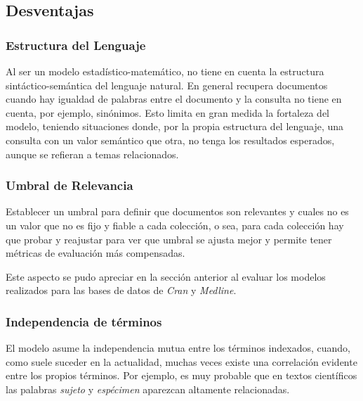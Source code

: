 \subsection{Desventajas}

\subsubsection{Estructura del Lenguaje}

Al ser un modelo estadístico-matemático, no tiene en cuenta la estructura
sintáctico-semántica del lenguaje natural. En general recupera documentos
cuando hay igualdad de palabras entre el documento y la consulta no tiene en
cuenta, por ejemplo, sinónimos. Esto limita en gran medida la fortaleza del
modelo, teniendo situaciones donde, por la propia estructura del lenguaje, una
consulta con un valor semántico que otra, no tenga los resultados esperados,
aunque se refieran a temas relacionados.

\subsubsection{Umbral de Relevancia}

Establecer un umbral para definir que documentos son relevantes y cuales no es
un valor que no es fijo y fiable a cada colección, o sea, para cada colección
hay que probar y reajustar para ver que umbral se ajusta mejor y permite tener
métricas de evaluación más compensadas.

Este aspecto se pudo apreciar en la sección anterior al evaluar los modelos
realizados para las bases de datos de \emph{Cran} y \emph{Medline}.

\subsubsection{Independencia de términos}

El modelo asume la independencia mutua entre los términos indexados, cuando,
como suele suceder en la actualidad, muchas veces existe una correlación
evidente entre los propios términos. Por ejemplo, es muy probable que en
textos científicos las palabras \emph{sujeto} y \emph{espécimen} aparezcan
altamente relacionadas.

